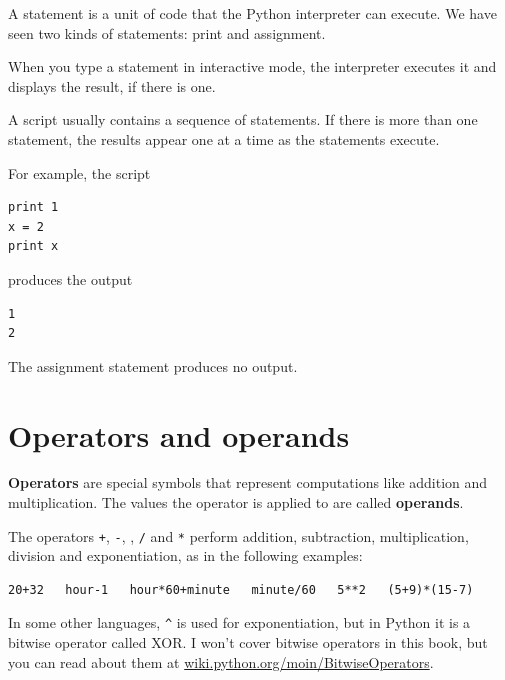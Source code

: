 \documentclass[10pt]{book}
\begin{document}
A statement is a unit of code that the Python interpreter can
execute.  We have seen two kinds of statements: print
and assignment.


When you type a statement in interactive mode, the interpreter
executes it and displays the result, if there is one.

A script usually contains a sequence of statements.  If there
is more than one statement, the results appear one at a time
as the statements execute.

For example, the script

\beforeverb
\begin{verbatim}
print 1
x = 2
print x
\end{verbatim}
\afterverb
%
produces the output

\beforeverb
\begin{verbatim}
1
2
\end{verbatim}
\afterverb
%
The assignment statement produces no output.


\section{Operators and operands}

{\bf Operators} are special symbols that represent computations like
addition and multiplication.  The values the operator is applied to
are called {\bf operands}.

The operators {\tt +}, {\tt -}, {\tt *}, {\tt /} and {\tt **}
perform addition, subtraction, multiplication, division and
exponentiation, as in the following examples:

\beforeverb
\begin{verbatim}
20+32   hour-1   hour*60+minute   minute/60   5**2   (5+9)*(15-7)
\end{verbatim}
\afterverb
%
In some other languages, \verb"^" is used for exponentiation, but
in Python it is a bitwise operator called XOR.  I won't cover
bitwise operators in this book, but you can read about
them at \url{wiki.python.org/moin/BitwiseOperators}.


\end{document}
